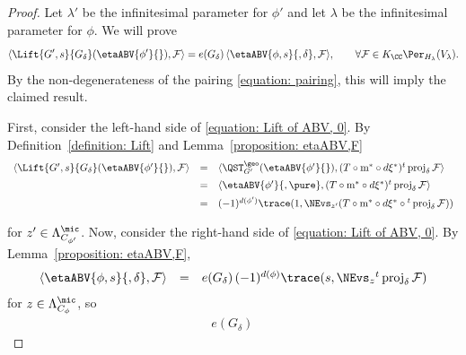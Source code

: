 \documentclass[11pt,letterpaper]{amsart}
\newcommand{\calm}{\textrm{m}}
\numberwithin{equation}{section}
\begin{document}
\begin{proof}
Let $\lambda'$ be the infinitesimal parameter for $\phi'$ and let $\lambda$ be the infinitesimal parameter for $\phi$.
    We will prove
\begin{equation}\label{equation: Lift of ABV, 0}
    \langle \Lift{G',s}{G_\delta}( \etaABV{\phi'}{}), \mathcal{F} \rangle
    =
    e(G_\delta)\,
    \langle
    \etaABV{\phi,s}{,\delta} , \mathcal{F} \rangle,
    \qquad\forall \mathcal{F}\in K_\CC\Per_{H_{\lambda}}(V_{\lambda}).  
\end{equation}
By the non-degenerateness of the pairing \eqref{equation: pairing}, this will imply the claimed result. 


First, consider the left-hand side of \eqref{equation: Lift of ABV, 0}.
By Definition~\ref{definition: Lift} and Lemma~\ref{proposition: etaABV,F}
\begin{equation*}
    \begin{array}{rcl}
\langle
    \Lift{G',s}{G_\delta}( \etaABV{\phi'}{}) , \mathcal{F} 
\rangle
    &=& 
    \langle
    \QST^\geo_{G'}(\etaABV{\phi'}{}) , (T\circ \calm^*\circ d\xi^*) 
    {}^t\operatorname{proj}_{\delta} \mathcal{F} 
\rangle
\vspace{0.5em} \\
    &=&
    \langle
    \etaABV{\phi'}{,\pure} , (T\circ \calm^*\circ d\xi^*)
{}^t\operatorname{proj}_{\delta} \mathcal{F} 
\rangle
\vspace{0.5em} \\
    &=&
 (-1)^{d(\phi')}
\trace(1,\NEvs_{z'} (T\circ\calm^*\circ d\xi^* \circ
{}^t\operatorname{proj}_{\delta} \mathcal{F}))
\vspace{0.5em} 
    \end{array}
\end{equation*}
for $z'\in \Lambda^\mic_{C_{\phi'}}$.
Now, consider the right-hand side of \eqref{equation: Lift of ABV, 0}.
By Lemma~\ref{proposition: etaABV,F},  
\begin{equation}\label{equation: Lift of ABV, 1}
    \begin{array}{rcl}
\langle
    \etaABV{\phi,s}{,\delta} , \mathcal{F} 
\rangle
    &=&
 e(G_\delta)\,
(-1)^{d(\phi)}
\trace(s,\NEvs_{z}  
{}^t\operatorname{proj}_{\delta} \mathcal{F})
    \end{array}
\end{equation}
for $z\in \Lambda^\mic_{C_\phi}$,
so
\begin{equation}\label{equation: Lift of ABV, 2}
    \begin{array}{rcl}
e(G_\delta)\,

\end{array}
\end{equation}
\end{proof}
\end{document}
